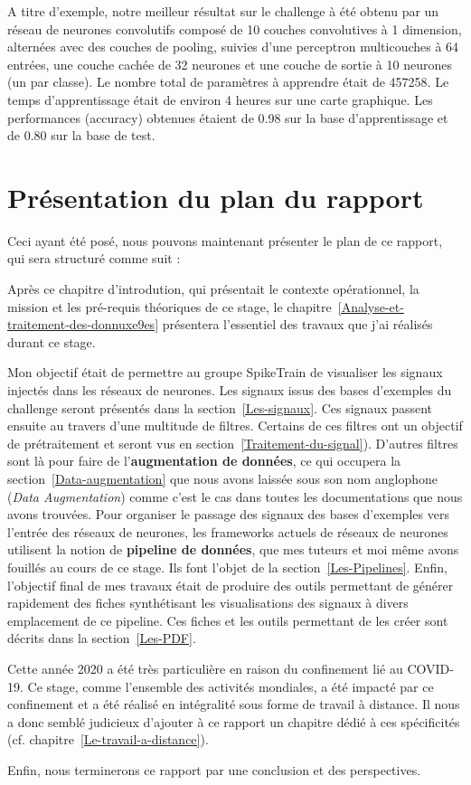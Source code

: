 A titre d'exemple, notre meilleur résultat sur le challenge à été obtenu par un réseau de neurones convolutifs composé de 10 couches convolutives à 1 dimension, alternées avec des couches de pooling, suivies d'une perceptron multicouches à 64 entrées, une couche cachée de 32 neurones et une couche de sortie à 10 neurones (un par classe). Le nombre total de paramètres à apprendre était de 457258. Le temps d'apprentissage était de environ 4 heures sur une carte graphique.
Les performances (accuracy) obtenues étaient de 0.98 sur la base d'apprentissage et de 0.80 sur la base de test.


\hypertarget{plan}{%
\section{Présentation du plan du rapport}%
\label{Présentation du plan du rapport}}

Ceci ayant été posé, nous pouvons maintenant présenter le plan de ce rapport,
qui sera structuré comme suit :

Après ce chapitre d'introdution, qui présentait le contexte opérationnel, la mission et les pré-requis théoriques de ce stage, le
chapitre~\ref{Analyse-et-traitement-des-donnuxe9es} présentera l'essentiel
des travaux que j'ai réalisés durant ce stage.

Mon objectif était de permettre au groupe SpikeTrain de visualiser les signaux
injectés dans les réseaux de neurones.
Les signaux issus des bases d'exemples du challenge seront présentés dans la section~\ref{Les-signaux}.
Ces signaux passent ensuite au travers d'une multitude de filtres.
Certains de ces filtres ont un objectif de prétraitement et seront vus en section~\ref{Traitement-du-signal}).
D'autres filtres sont là pour faire de l'\textbf{augmentation de données}, ce
qui occupera la section~\ref{Data-augmentation} que nous avons laissée sous son
nom anglophone (\textit{Data Augmentation}) comme c'est le cas dans toutes les documentations que nous avons
trouvées.
Pour organiser le passage des signaux des bases d'exemples vers l'entrée des réseaux de neurones, les frameworks actuels de réseaux de neurones utilisent
la notion de \textbf{pipeline de données}, que mes tuteurs et moi même avons
fouillés au cours de ce stage. Ils font l'objet de la
section~\ref{Les-Pipelines}.
Enfin, l'objectif final de mes travaux était de produire des outils permettant
de générer rapidement des fiches synthétisant les visualisations des signaux à divers emplacement de ce pipeline. Ces fiches et les outils permettant de les
créer sont décrits dans la section~\ref{Les-PDF}.

Cette année 2020 a été très particulière en raison du confinement lié au
COVID-19. Ce stage, comme l'ensemble des activités mondiales, a été
impacté par ce confinement et a été réalisé en intégralité sous forme de
travail à distance. Il nous a donc semblé judicieux d'ajouter à ce rapport un
chapitre dédié à ces spécificités (cf. chapitre~\ref{Le-travail-a-distance}).

Enfin, nous terminerons ce rapport par une conclusion et des perspectives.
